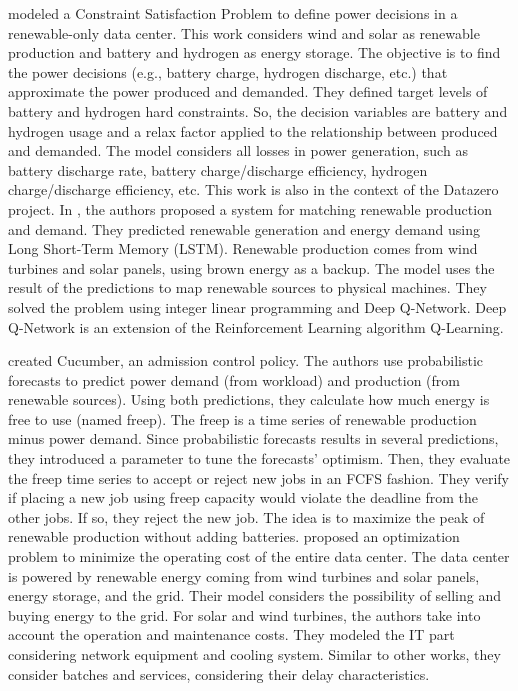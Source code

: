 \citeauthor{haddad2019mixed} \cite{haddad2019mixed} modeled a Constraint Satisfaction Problem to define power decisions in a renewable-only data center. This work considers wind and solar as renewable production and battery and hydrogen as energy storage. The objective is to find the power decisions (e.g., battery charge, hydrogen discharge, etc.) that approximate the power produced and demanded. They defined target levels of battery and hydrogen hard constraints. So, the decision variables are battery and hydrogen usage and a relax factor applied to the relationship between produced and demanded. The model considers all losses in power generation, such as battery discharge rate, battery charge/discharge efficiency, hydrogen charge/discharge efficiency, etc. This work is also in the context of the Datazero project. In \cite{gao2020smartly}, the authors proposed a system for matching renewable production and demand. They predicted renewable generation and energy demand using Long Short-Term Memory (LSTM). Renewable production comes from wind turbines and solar panels, using brown energy as a backup. The model uses the result of the predictions to map renewable sources to physical machines. They solved the problem using integer linear programming and Deep Q-Network. Deep Q-Network is an extension of the Reinforcement Learning algorithm Q-Learning. 

\citeauthor{wiesner2022cucumber} \cite{wiesner2022cucumber} created Cucumber, an admission control policy. The authors use probabilistic forecasts to predict power demand (from workload) and production (from renewable sources). Using both predictions, they calculate how much energy is free to use (named freep). The freep is a time series of renewable production minus power demand. Since probabilistic forecasts results in several predictions, they introduced a parameter to tune the forecasts' optimism. Then, they evaluate the freep time series to accept or reject new jobs in an FCFS fashion. They verify if placing a new job using freep capacity would violate the deadline from the other jobs. If so, they reject the new job. The idea is to maximize the peak of renewable production without adding batteries. \citeauthor{yuan2022optimal} \cite{yuan2022optimal} proposed an optimization problem to minimize the operating cost of the entire data center. The data center is powered by renewable energy coming from wind turbines and solar panels, energy storage, and the grid. Their model considers the possibility of selling and buying energy to the grid. For solar and wind turbines, the authors take into account the operation and maintenance costs. They modeled the IT part considering network equipment and cooling system. Similar to other works, they consider batches and services, considering their delay characteristics. 

